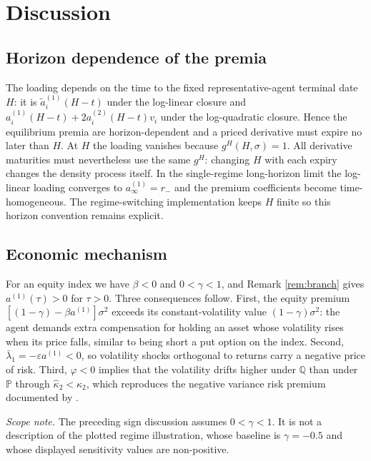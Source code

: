 \documentclass[11pt]{article}
\theoremstyle{remark}
\newcommand{\PP}{\mathbb{P}}
\newcommand{\QQ}{\mathbb{Q}}
\begin{document}
\section{Discussion}\label{sec:discussion}

\subsection{Horizon dependence of the premia}
The loading depends on the time to the fixed representative-agent terminal date
$H$: it is $\widetilde a_i^{(1)}(H-t)$ under the log-linear closure and
$a_i^{(1)}(H-t)+2a_i^{(2)}(H-t)v_i$ under the log-quadratic closure.  Hence the
equilibrium premia are horizon-dependent and a priced derivative must expire no
later than $H$.  At $H$ the loading vanishes because $g^H(H,\sigma)=1$.  All
derivative maturities must nevertheless use the same $g^H$: changing $H$ with each
expiry changes the density process itself.  In the single-regime long-horizon limit
the log-linear loading converges to $a^{(1)}_{\infty}=r_{-}$ and the premium
coefficients become time-homogeneous.  The regime-switching implementation keeps
$H$ finite so this horizon convention remains explicit.

\subsection{Economic mechanism}
For an equity index we have $\beta<0$ and $0<\gamma<1$, and Remark \ref{rem:branch} gives $a^{(1)}(\tau)>0$ for $\tau > 0$. Three consequences follow. First, the equity premium $\left[(1-\gamma) - \beta a^{(1)}\right]\sigma^{2}$ exceeds its constant-volatility value $(1-\gamma)\sigma^{2}$: the agent demands extra compensation for holding an asset whose volatility rises when its price falls, similar to being short a put option on the index. Second, $\bar\lambda_{1} = -\varepsilon a^{(1)}<0$, so volatility shocks orthogonal to returns carry a negative price of risk. Third, $\varphi<0$ implies that the volatility drifts higher under $\QQ$ than under $\PP$ through $\hat\kappa_{2} < \kappa_{2}$, which reproduces the negative variance risk premium documented by \cite{BakshiKapadia2003}.

\noindent\emph{Scope note.}  The preceding sign discussion assumes
$0<\gamma<1$.  It is not a description of the plotted regime illustration, whose
baseline is $\gamma=-0.5$ and whose displayed sensitivity values are non-positive.
\end{document}
